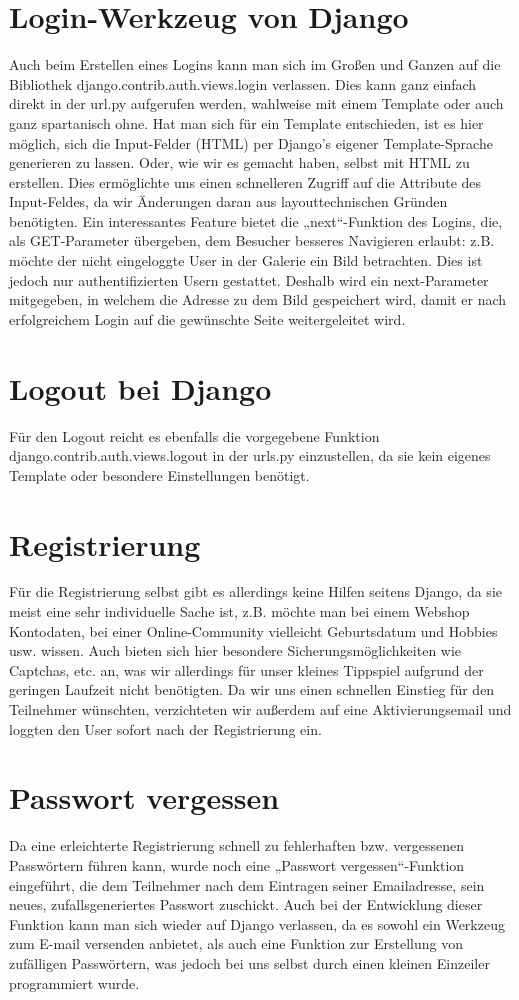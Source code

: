 \section{Login-Werkzeug von Django}
Auch beim Erstellen eines Logins kann man sich im Großen und Ganzen auf die 
Bibliothek django.contrib.auth.views.login verlassen. Dies kann ganz einfach 
direkt in der url.py aufgerufen werden, wahlweise mit einem Template oder auch 
ganz spartanisch ohne. Hat man sich für ein Template entschieden, ist es hier 
möglich, sich die Input-Felder (HTML) per Django's eigener Template-Sprache 
generieren zu lassen. Oder, wie wir es gemacht haben, selbst mit HTML zu 
erstellen. Dies ermöglichte uns einen schnelleren Zugriff auf die Attribute des
Input-Feldes, da wir Änderungen daran aus layouttechnischen Gründen benötigten.
Ein interessantes Feature bietet die „next“-Funktion des Logins, die, als 
GET-Parameter übergeben, dem Besucher besseres Navigieren erlaubt: z.B. möchte 
der nicht eingeloggte User in der Galerie ein Bild betrachten. Dies ist jedoch 
nur authentifizierten Usern gestattet. Deshalb wird ein next-Parameter 
mitgegeben, in welchem die Adresse zu dem Bild gespeichert wird, damit er nach 
erfolgreichem Login auf die gewünschte Seite weitergeleitet wird.


\section{Logout bei Django}
Für den Logout reicht es ebenfalls die vorgegebene Funktion 
django.contrib.auth.views.logout in der urls.py einzustellen, da sie kein 
eigenes Template oder besondere Einstellungen benötigt.


\section{Registrierung}
Für die Registrierung selbst gibt es allerdings keine Hilfen seitens Django, da
sie meist eine sehr individuelle Sache ist, z.B. möchte man bei einem Webshop 
Kontodaten, bei einer Online-Community vielleicht Geburtsdatum und Hobbies usw.
wissen. Auch bieten sich hier besondere Sicherungsmöglichkeiten wie Captchas,
etc. an, was wir allerdings für unser kleines Tippspiel aufgrund der geringen 
Laufzeit nicht benötigten. Da wir uns einen schnellen Einstieg für den 
Teilnehmer wünschten, verzichteten wir außerdem auf eine Aktivierungsemail und 
loggten den User sofort nach der Registrierung ein.

\section{Passwort vergessen}
Da eine erleichterte Registrierung schnell zu fehlerhaften bzw. vergessenen 
Passwörtern führen kann, wurde noch eine „Passwort vergessen“-Funktion 
eingeführt, die dem Teilnehmer nach dem Eintragen seiner Emailadresse, sein 
neues, zufallsgeneriertes Passwort zuschickt. Auch bei der Entwicklung dieser
Funktion kann man sich wieder auf Django verlassen, da es sowohl ein Werkzeug
zum E-mail versenden anbietet, als auch eine Funktion zur Erstellung von 
zufälligen Passwörtern, was jedoch bei uns selbst durch einen kleinen Einzeiler 
programmiert wurde.

